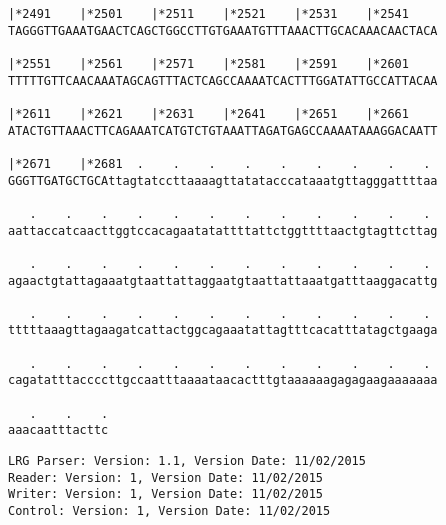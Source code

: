 \documentclass{article}
\begin{document}
\begin{Verbatim}[fontfamily=courier]
|*2491    |*2501    |*2511    |*2521    |*2531    |*2541    
TAGGGTTGAAATGAACTCAGCTGGCCTTGTGAAATGTTTAAACTTGCACAAACAACTACA

|*2551    |*2561    |*2571    |*2581    |*2591    |*2601    
TTTTTGTTCAACAAATAGCAGTTTACTCAGCCAAAATCACTTTGGATATTGCCATTACAA

|*2611    |*2621    |*2631    |*2641    |*2651    |*2661    
ATACTGTTAAACTTCAGAAATCATGTCTGTAAATTAGATGAGCCAAAATAAAGGACAATT

|*2671    |*2681  .    .    .    .    .    .    .    .    . 
GGGTTGATGCTGCAttagtatccttaaaagttatatacccataaatgttagggattttaa

   .    .    .    .    .    .    .    .    .    .    .    . 
aattaccatcaacttggtccacagaatatattttattctggttttaactgtagttcttag

   .    .    .    .    .    .    .    .    .    .    .    . 
agaactgtattagaaatgtaattattaggaatgtaattattaaatgatttaaggacattg

   .    .    .    .    .    .    .    .    .    .    .    . 
tttttaaagttagaagatcattactggcagaaatattagtttcacatttatagctgaaga

   .    .    .    .    .    .    .    .    .    .    .    . 
cagatatttaccccttgccaatttaaaataacactttgtaaaaaagagagaagaaaaaaa

   .    .    .
aaacaatttacttc
\end{Verbatim}
\newpage
\begin{Verbatim}[fontfamily=courier]
LRG Parser: Version: 1.1, Version Date: 11/02/2015
Reader: Version: 1, Version Date: 11/02/2015
Writer: Version: 1, Version Date: 11/02/2015
Control: Version: 1, Version Date: 11/02/2015
\end{Verbatim}
\end{document}
